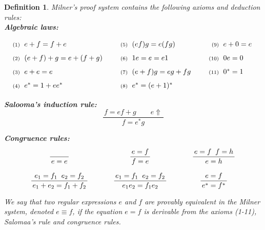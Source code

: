 \documentclass{article}
\newcommand{\damien}[1]{%
  \marginpar{\parbox{\marginparwidth}{\footnotesize\raggedright\color{red}dp: #1}}%
}
\newtheorem{definition}{Definition}[section]
\begin{document}
\begin{definition} \emph{Milner's proof system} 
    contains the following axioms and deduction rules:~\\
    
\textbf{Algebraic laws:}
\[
\renewcommand{\arraystretch}{1.6} %
\begin{array}{@{\hspace{3pt}}r@{\hspace{6pt}}l
                  @{\hspace{25pt}}r@{\hspace{6pt}}l
                  @{\hspace{25pt}}r@{\hspace{6pt}}l}
\text{\scriptsize (1)}  & e + f = f + e            
  & \text{\scriptsize (5)}  & (ef)g = e(fg)         
  & \text{\scriptsize (9)}  & e + 0 = e \\

\text{\scriptsize (2)}  & (e + f) + g = e + (f + g) 
  & \text{\scriptsize (6)}  & 1e = e = e1           
  & \text{\scriptsize (10)} & 0e = 0 \\

\text{\scriptsize (3)}  & e + e = e                 
  & \text{\scriptsize (7)}  & (e+f)g = eg + fg      
  & \text{\scriptsize (11)} & 0^* = 1 \\

\text{\scriptsize (4)}  & e^* = 1 + e e^*           
  & \text{\scriptsize (8)}  & e^* = (e+1)^*         
  &                     & 
\end{array}
\]

\damien{salooma/salomaa}
\textbf{Salooma's induction rule:}
\vspace{.5em}
\[
\frac{\, f= ef + g\qquad e\Uparrow\,}{\,f=e^*g\,}
\]

\textbf{Congruence rules:}
\[
\renewcommand{\arraystretch}{1.8}
\begin{array}{c@{\hspace{35pt}}c@{\hspace{35pt}}c}
\dfrac{}{\,e = e\,} 
  & \dfrac{\,e = f\,}{\,f = e\,} 
  & \dfrac{\,e = f \;\; f = h\,}{\,e = h\,} \\[12pt]
\dfrac{\,e_1 = f_1 \;\; e_2 = f_2\,}{\,e_1 + e_2 = f_1 + f_2\,}
  & \dfrac{\,e_1 = f_1 \;\; e_2 = f_2\,}{\,e_1 e_2 = f_1 e_2\,}
  & \dfrac{\,e = f\,}{\,e^{*} = f^{*}\,}
\end{array}
\]
\vspace{1em}

We say that two regular expressions $e$ and $f$ are \emph{provably equivalent} in the Milner system, denoted $e \equiv f$, if the equation $e = f$ is derivable from the axioms (1-11), Salomaa's  rule and congruence rules.
\end{definition}
\end{document}
